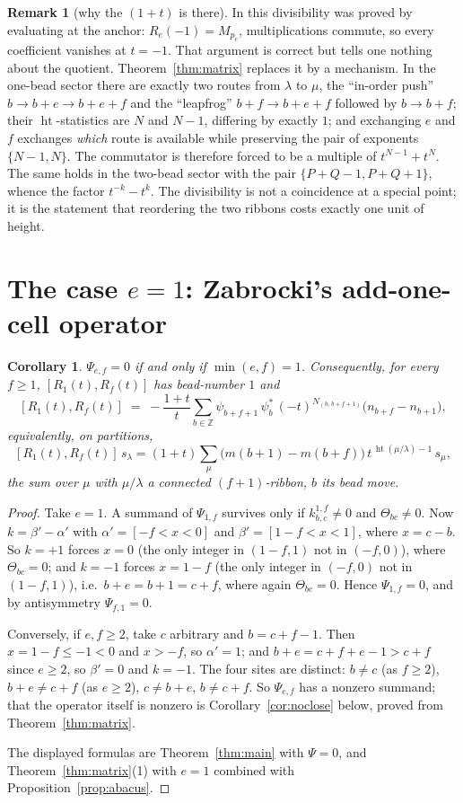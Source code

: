 \documentclass[11pt]{article}
\newtheorem{corollary}[theorem]{Corollary}
\theoremstyle{definition}
\newtheorem{remark}[theorem]{Remark}
\newcommand{\hgt}{\operatorname{ht}}          %
\newcommand{\Z}{\mathbb{Z}}
\newcommand{\Mult}[1]{M_{#1}}
\begin{document}
\begin{remark}[why the $(1+t)$ is there]
In \cite[Cor.~5.6]{Clio0906} this divisibility was proved by evaluating at the anchor:
$R_e(-1)=\Mult{p_e}$, multiplications commute, so every coefficient vanishes at $t=-1$.
That argument is correct but tells one nothing about the quotient.
Theorem~\ref{thm:matrix} replaces it by a mechanism.  In the one-bead sector there are
exactly two routes from $\lambda$ to $\mu$, the ``in-order push''
$b\to b+e\to b+e+f$ and the ``leapfrog'' $b+f\to b+e+f$ followed by $b\to b+f$; their
$\hgt$-statistics are $N$ and $N-1$, differing by exactly $1$; and exchanging $e$ and $f$
exchanges \emph{which} route is available while preserving the pair of exponents
$\{N-1,N\}$.  The commutator is therefore forced to be a multiple of $t^{N-1}+t^{N}$.
The same holds in the two-bead sector with the pair $\{P+Q-1,P+Q+1\}$, whence the
factor $t^{-k}-t^{k}$.  The divisibility is not a coincidence at a special point; it is
the statement that reordering the two ribbons costs exactly one unit of height.
\end{remark}

\section{The case $e=1$: Zabrocki's add-one-cell operator}

\begin{corollary}\label{cor:e1}
$\Psi_{e,f}=0$ if and only if $\min(e,f)=1$.  Consequently, for every $f\ge1$,
$[R_1(t),R_f(t)]$ has bead-number $1$ and
\[
 [R_1(t),R_f(t)]\;=\;-\frac{1+t}{t}\sum_{b\in\Z}\psi_{b+f+1}\,\psi_b^{*}\,
   (-t)^{N_{(b,\,b+f+1)}}\bigl(n_{b+f}-n_{b+1}\bigr),
\]
equivalently, on partitions,
\[
 [R_1(t),R_f(t)]\,s_\lambda=(1+t)\sum_{\mu}\bigl(m(b+1)-m(b+f)\bigr)\,
   t^{\,\hgt(\mu/\lambda)-1}\,s_\mu ,
\]
the sum over $\mu$ with $\mu/\lambda$ a connected $(f{+}1)$-ribbon, $b$ its bead move.
\end{corollary}

\begin{proof}
Take $e=1$.  A summand of $\Psi_{1,f}$ survives only if $k^{1,f}_{b,c}\ne0$ and
$\Theta_{bc}\ne0$.  Now $k=\beta'-\alpha'$ with $\alpha'=[-f<x<0]$ and
$\beta'=[1-f<x<1]$, where $x=c-b$.  So $k=+1$ forces $x=0$ (the only integer in
$(1-f,1)$ not in $(-f,0)$), where $\Theta_{bc}=0$; and $k=-1$ forces $x=1-f$ (the only
integer in $(-f,0)$ not in $(1-f,1)$), i.e.\ $b+e=b+1=c+f$, where again $\Theta_{bc}=0$.
Hence $\Psi_{1,f}=0$, and by antisymmetry $\Psi_{f,1}=0$.

Conversely, if $e,f\ge2$, take $c$ arbitrary and $b=c+f-1$.  Then $x=1-f\le-1<0$ and
$x>-f$, so $\alpha'=1$; and $b+e=c+f+e-1>c+f$ since $e\ge2$, so $\beta'=0$ and $k=-1$.
The four sites are distinct: $b\ne c$ (as $f\ge2$), $b+e\ne c+f$ (as $e\ge2$),
$c\ne b+e$, $b\ne c+f$.  So $\Psi_{e,f}$ has a nonzero summand; that the operator itself
is nonzero is Corollary~\ref{cor:noclose} below, proved from Theorem~\ref{thm:matrix}.

The displayed formulas are Theorem~\ref{thm:main} with $\Psi=0$, and
Theorem~\ref{thm:matrix}(1) with $e=1$ combined with Proposition~\ref{prop:abacus}.
\end{proof}
\end{document}
